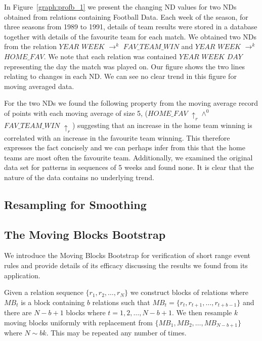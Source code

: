 In Figure~\ref{graph:profb_1} we present the changing ND values for
two NDs obtained from relations containing Football Data. Each week of
the season, for three seasons from 1989 to 1991, details of team
results were stored in a database together with details of the
favourite team for each match. We obtained two NDs from the relation
$YEAR$ $WEEK$ $\to^k$ $FAV\_TEAM\_WIN$ and $YEAR$ $WEEK$ $\to^k$
$HOME\_FAV$. We note that each relation was contained $YEAR$ $WEEK$
$DAY$ representing the day the match was played on. Our figure shows
the two lines relating to changes in each ND. We can see no clear
trend in this figure for moving averaged data.

\medskip

For the two NDs we found the following property from the moving
average record of points with each moving average of size 5,
 ($HOME\_FAV$ $\uparrow_r \wedge^0$ $FAV\_TEAM\_WIN$ $\uparrow_r$) suggesting that an
increase in the home team winning is correlated with an increase in
the favourite team winning. This therefore expresses the fact
concisely and we can perhaps infer from this that the home teams are
most often the favourite team. Additionally, we examined the original
data set for patterns in sequences of 5 weeks and found none. It is
clear that the nature of the data contains no underlying trend.



\subsection{Resampling for Smoothing}\label{subsec:tr_res}

\subsection{The Moving Blocks Bootstrap}\label{subsec:tr_mbb}


We introduce the Moving Blocks Bootstrap for verification of short
range event rules and provide details of its efficacy discussing the
results we found from its application.

\begin{definition}
\begin{rm}
Given a relation sequence \linebreak[4] $\{ r_1, r_2, \ldots, r_N \}$
we construct blocks of relations where $MB_t$ is a block containing
$b$ relations such that $MB_t = \{ r_t, r_{t+1}, \ldots, r_{t+b-1} \}$
and there are $N - b+ 1$ blocks where $t = 1, 2, \ldots, N-b+1$. We
then resample $k$ moving blocks uniformly with replacement from $\{
MB_1, MB_2, \ldots, MB_{N-b+1} \}$ where $N \sim bk$. This may be repeated any number of times.
\end{rm}
\end{definition}

